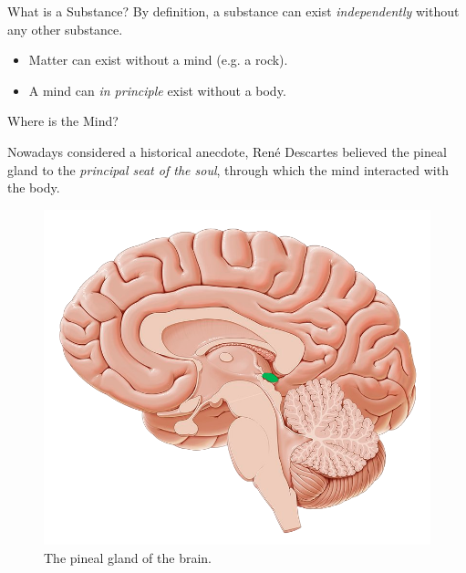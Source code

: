 \documentclass[aspectratio=1610]{beamer}
\begin{document}

\begin{frame}{What is a Substance?}
	By definition, a \alert{substance} can exist \emph{independently} without any other substance.

	\begin{itemize}
		\pause
		\item Matter can exist without a mind (e.g. a rock).
		\pause
		\item A mind can \textit{in principle} exist without a body.
	\end{itemize}
\end{frame}


\begin{frame}{Where is the Mind?}
	\pause

	Nowadays considered a historical anecdote, René Descartes believed the \alert{pineal gland} to the \textit{principal seat of the soul}, through which the mind interacted with the body.

	\begin{figure}
		\centering
		\includegraphics[height=0.55\paperheight]{inc/pineal_gland.png}
		\caption{The pineal gland of the brain.}
	\end{figure}
\end{frame}
\end{document}
